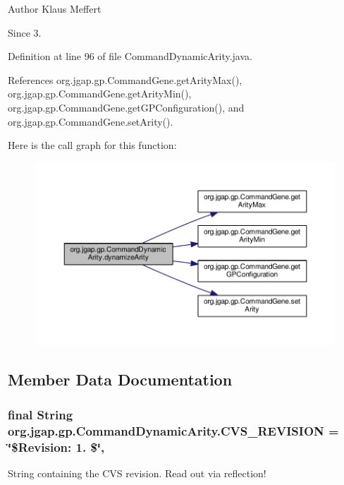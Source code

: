 \begin{DoxyAuthor}{Author}
Klaus Meffert 
\end{DoxyAuthor}
\begin{DoxySince}{Since}
3. 
\end{DoxySince}


Definition at line 96 of file Command\-Dynamic\-Arity.\-java.



References org.\-jgap.\-gp.\-Command\-Gene.\-get\-Arity\-Max(), org.\-jgap.\-gp.\-Command\-Gene.\-get\-Arity\-Min(), org.\-jgap.\-gp.\-Command\-Gene.\-get\-G\-P\-Configuration(), and org.\-jgap.\-gp.\-Command\-Gene.\-set\-Arity().



Here is the call graph for this function\-:
\nopagebreak
\begin{figure}[H]
\begin{center}
\leavevmode
\includegraphics[width=350pt]{classorg_1_1jgap_1_1gp_1_1_command_dynamic_arity_a4077850471373a67d40569e810b9a170_cgraph}
\end{center}
\end{figure}




\subsection{Member Data Documentation}
\hypertarget{classorg_1_1jgap_1_1gp_1_1_command_dynamic_arity_aefd7dd683f00353b2fc7d25ab7686784}{
\subsubsection[{C\-V\-S\-\_\-\-R\-E\-V\-I\-S\-I\-O\-N}]{\setlength{\rightskip}{0pt plus 5cm}final String org.\-jgap.\-gp.\-Command\-Dynamic\-Arity.\-C\-V\-S\-\_\-\-R\-E\-V\-I\-S\-I\-O\-N = \char`\"{}\$Revision\-: 1. \$\char`\"{}\hspace{0.3cm}{\ttfamily [static]}, {\ttfamily [private]}}}\label{classorg_1_1jgap_1_1gp_1_1_command_dynamic_arity_aefd7dd683f00353b2fc7d25ab7686784}
String containing the C\-V\-S revision. Read out via reflection! 

